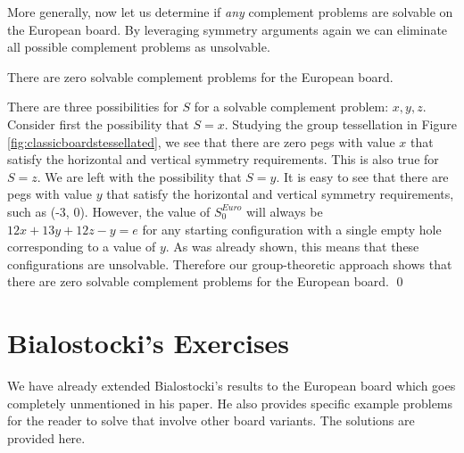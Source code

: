 \documentclass[11pt]{article}
\newenvironment{claim}[1]{\par\noindent{\bfseries Claim.}\space#1}{}
\renewenvironment{proof}{{\noindent\bfseries Proof.}}{\qed}
\begin{document}
More generally, now let us determine if \emph{any} complement problems are solvable on the European board. By leveraging symmetry arguments again we can eliminate all possible complement problems as unsolvable.

\begin{claim}
There are zero solvable complement problems for the European board.
\end{claim}

\begin{proof}
There are three possibilities for $S$ for a solvable complement problem: $x, y, z$. Consider first the possibility that $S = x$. Studying the group tessellation in Figure \ref{fig:classicboardstessellated}, we see that there are zero pegs with value $x$ that satisfy the horizontal and vertical symmetry requirements. This is also true for $S = z$. We are left with the possibility that $S = y$. It is easy to see that there are pegs with value $y$ that satisfy the horizontal and vertical symmetry requirements, such as (-3, 0). However, the value of $S^{Euro}_0$ will always be $12x + 13y + 12z - y = e$ for any starting configuration with a single empty hole corresponding to a value of $y$. As was already shown, this means that these configurations are unsolvable. Therefore our group-theoretic approach shows that there are zero solvable complement problems for the European board.
\end{proof}

\section{Bialostocki's Exercises}
We have already extended Bialostocki's results to the European board which goes completely unmentioned in his paper. He also provides specific example problems for the reader to solve that involve other board variants. The solutions are provided here.
\end{document}
